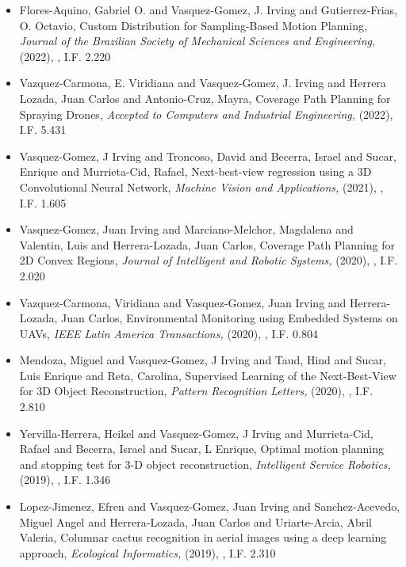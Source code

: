 \begin{itemize} 
\item Flores-Aquino, Gabriel O. and Vasquez-Gomez, J. Irving and Gutierrez-Frias, O. Octavio, Custom Distribution for Sampling-Based Motion Planning,\textit{ Journal of the Brazilian Society of Mechanical Sciences and Engineering,} (2022), \href{https://doi.org/10.1007/s40430-022-03379-0} {\faFilePdfO}, I.F. 2.220 
\item Vazquez-Carmona, E. Viridiana and Vasquez-Gomez, J. Irving and Herrera Lozada, Juan Carlos and Antonio-Cruz, Mayra, Coverage Path Planning for Spraying Drones,\textit{ Accepted to Computers and Industrial Engineering,} (2022), I.F. 5.431 
\item Vasquez-Gomez, J Irving and Troncoso, David and Becerra, Israel and Sucar, Enrique and Murrieta-Cid, Rafael, Next-best-view regression using a 3D Convolutional Neural Network,\textit{ Machine Vision and Applications,} (2021), \href{https://doi.org/10.1007/s00138-020-01166-2} {\faFilePdfO}, I.F. 1.605 
\item Vasquez-Gomez, Juan Irving and Marciano-Melchor, Magdalena and Valentin, Luis and Herrera-Lozada, Juan Carlos, Coverage Path Planning for 2D Convex Regions,\textit{ Journal of Intelligent and Robotic Systems,} (2020), \href{https://doi.org/10.1007/s10846-019-01024-y} {\faFilePdfO}, I.F. 2.020 
\item Vazquez-Carmona, Viridiana and Vasquez-Gomez, Juan Irving and Herrera-Lozada, Juan Carlos, Environmental Monitoring using Embedded Systems on UAVs,\textit{ IEEE Latin America Transactions,} (2020), \href{https://latamt.ieeer9.org/index.php/transactions/article/view/2891/399} {\faFilePdfO}, I.F. 0.804 
\item Mendoza, Miguel and Vasquez-Gomez, J Irving and Taud, Hind and Sucar, Luis Enrique and Reta, Carolina, Supervised Learning of the Next-Best-View for 3D Object Reconstruction,\textit{ Pattern Recognition Letters,} (2020), \href{https://doi.org/10.1016/j.patrec.2020.02.024} {\faFilePdfO}, I.F. 2.810 
\item Yervilla-Herrera, Heikel and Vasquez-Gomez, J Irving and Murrieta-Cid, Rafael and Becerra, Israel and Sucar, L Enrique, Optimal motion planning and stopping test for 3-D object reconstruction,\textit{ Intelligent Service Robotics,} (2019), \href{https://doi.org/10.1007/s11370-018-0264-y} {\faFilePdfO}, I.F. 1.346 
\item Lopez-Jimenez, Efren and Vasquez-Gomez, Juan Irving and Sanchez-Acevedo, Miguel Angel and Herrera-Lozada, Juan Carlos and Uriarte-Arcia, Abril Valeria, Columnar cactus recognition in aerial images using a deep learning approach,\textit{ Ecological Informatics,} (2019), \href{https://doi.org/10.1016/j.ecoinf.2019.05.005} {\faFilePdfO}, I.F. 2.310 

\end{itemize}
